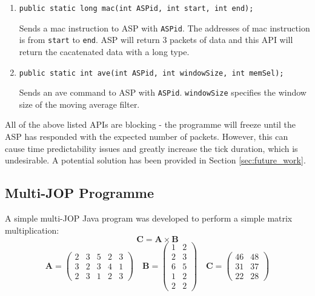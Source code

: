 \documentclass[]{article}
\begin{document}
\begin{enumerate}
		\item \texttt{public static long mac(int ASPid, int start, int end);}\par
		Sends a mac instruction to ASP with \texttt{ASPid}. The addresses of mac instruction is from \texttt{start} to \texttt{end}. ASP will return 3 packets of data and this API will return the cacatenated data with a long type.\\ \par
		
		\item \texttt{public static int ave(int ASPid, int windowSize, int memSel);}\par
		Sends an ave command to ASP with \texttt{ASPid}. \texttt{windowSize} specifies the window size of the moving average filter.\\ \par
		
	\end{enumerate}
	
	All of the above listed APIs are blocking - the programme will freeze until the ASP has responded with the expected number of packets. However, this can cause time predictability issues and greatly increase the tick duration, which is undesirable. A potential solution has been provided in Section \ref{sec:future_work}.
	
	
	
	
	\subsection{Multi-JOP Programme}
	
	A simple multi-JOP Java program was developed to perform a simple matrix multiplication:
	\begin{equation}
	\textbf{C} = \textbf{A} \times \textbf{B}
	\end{equation}
	\begin{equation}
	\textbf{A} = \begin{pmatrix}	2&3&5&2&3\\	3&2&3&4&1 \\ 2&3&1&2&3	\end{pmatrix}
	\quad
	\textbf{B} = \begin{pmatrix} 1&2 \\ 2&3 \\ 6&5 \\ 1&2 \\ 2&2 \end{pmatrix}
	\quad
	\textbf{C} = \begin{pmatrix} 46&48 \\ 31&37 \\22&28 \end{pmatrix}
	\end{equation}
	
\end{document}
